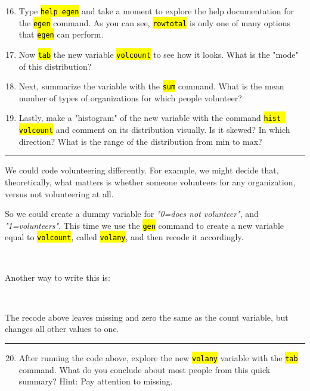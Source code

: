 \documentclass{tufte-handout}
\begin{document}
\begin{enumerate}[leftmargin=.5in]
\setcounter{enumi}{15}
	\item Type {\tt \hl{help egen}} and take a moment to explore the help documentation for the {\tt \hl{egen}} command. As you can see, {\tt \hl{rowtotal}} is only one of many options that {\tt \hl{egen}} can perform.
	\item Now {\tt \hl{tab}} the new variable {\tt \hl{volcount}} to see how it looks. What is the "mode" of this distribution?
	\item Next, summarize the variable with the {\tt \hl{sum}} command. What is the mean number of types of organizations for which people volunteer?
	\item Lastly, make a "histogram" of the new variable with the command {\tt \hl{hist volcount}} and comment on its distribution visually. Is it skewed? In which direction? What is the range of the distribution from min to max?
\end{enumerate}

\bigskip
\hrule
\bigskip

\medskip
{}
\medskip

We could code volunteering differently.  For example, we might decide that, theoretically, what matters is whether someone volunteers for any organization, versus not volunteering at all.  

So we could create a dummy variable for {\em "0=does not volunteer"}, and {\em "1=volunteers"}. This time we use the {\tt \hl{gen}} command to create a new variable equal to {\tt \hl{volcount}}, called {\tt \hl{volany}}, and then recode it accordingly.


\bigskip
{}\\
\bigskip

Another way to write this is:

\bigskip
{}\\
\bigskip

The recode above leaves missing and zero the same as the count variable, but changes all other values to one.

\bigskip
\hrule
\bigskip

\begin{enumerate}[leftmargin=.5in]
\setcounter{enumi}{19}
	\item After running the code above, explore the new {\tt \hl{volany}} variable with the {\tt \hl{tab}} command. What do you conclude about most people from this quick summary? Hint: Pay attention to missing.
\end{enumerate}
\end{document}
